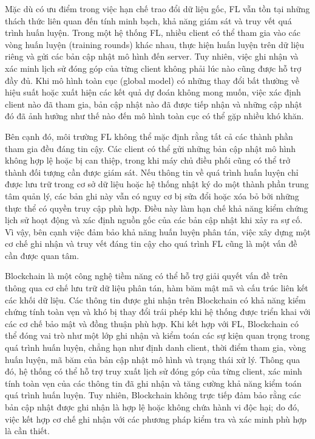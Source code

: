 Mặc dù có ưu điểm trong việc hạn chế trao đổi dữ liệu gốc, \ac{FL} vẫn tồn tại những thách thức
liên quan đến tính minh bạch, khả năng giám sát và truy vết quá trình huấn luyện. Trong một hệ
thống FL, nhiều client có thể tham gia vào các vòng huấn luyện (training rounds) khác nhau, thực
hiện huấn luyện trên dữ liệu riêng và gửi các bản cập nhật mô hình đến server. Tuy nhiên, việc ghi
nhận và xác minh lịch sử đóng góp của từng client không phải lúc nào cũng được hỗ trợ đầy đủ. Khi
mô hình toàn cục (global model) có những thay đổi bất thường về hiệu suất hoặc xuất hiện các kết
quả dự đoán không mong muốn, việc xác định client nào đã tham gia, bản cập nhật nào đã được tiếp
nhận và những cập nhật đó đã ảnh hưởng như thế nào đến mô hình toàn cục có thể gặp nhiều khó khăn.

Bên cạnh đó, môi trường \ac{FL} không thể mặc định rằng tất cả các thành phần tham gia đều đáng tin
cậy. Các client có thể gửi những bản cập nhật mô hình không hợp lệ hoặc bị can thiệp, trong khi máy
chủ điều phối cũng có thể trở thành đối tượng cần được giám sát. Nếu thông tin về quá trình huấn
luyện chỉ được lưu trữ trong cơ sở dữ liệu hoặc hệ thống nhật ký do một thành phần trung tâm quản
lý, các bản ghi này vẫn có nguy cơ bị sửa đổi hoặc xóa bỏ bởi những thực thể có quyền truy cập phù
hợp. Điều này làm hạn chế khả năng kiểm chứng lịch sử hoạt động và xác định nguồn gốc của các bản
cập nhật khi xảy ra sự cố. Vì vậy, bên cạnh việc đảm bảo khả năng huấn luyện phân tán, việc xây
dựng một cơ chế ghi nhận và truy vết đáng tin cậy cho quá trình \ac{FL} cũng là một vấn đề cần được
quan tâm.

Blockchain là một công nghệ tiềm năng có thể hỗ trợ giải quyết vấn đề trên thông qua cơ chế lưu trữ
dữ liệu phân tán, hàm băm mật mã và cấu trúc liên kết các khối dữ liệu. Các thông tin được ghi nhận
trên Blockchain có khả năng kiểm chứng tính toàn vẹn và khó bị thay đổi trái phép khi hệ thống được
triển khai với các cơ chế bảo mật và đồng thuận phù hợp. Khi kết hợp với \ac{FL}, Blockchain có thể
đóng vai trò như một lớp ghi nhận và kiểm toán các sự kiện quan trọng trong quá trình huấn luyện,
chẳng hạn như định danh client, thời điểm tham gia, vòng huấn luyện, mã băm của bản cập nhật mô
hình và trạng thái xử lý. Thông qua đó, hệ thống có thể hỗ trợ truy xuất lịch sử đóng góp của từng
client, xác minh tính toàn vẹn của các thông tin đã ghi nhận và tăng cường khả năng kiểm toán quá
trình huấn luyện. Tuy nhiên, Blockchain không trực tiếp đảm bảo rằng các bản cập nhật được ghi nhận
là hợp lệ hoặc không chứa hành vi độc hại; do đó, việc kết hợp cơ chế ghi nhận với các phương pháp
kiểm tra và xác minh phù hợp là cần thiết.

